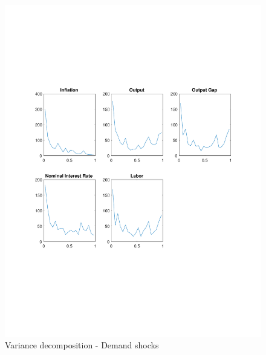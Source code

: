 \documentclass[12pt]{article}
\theoremstyle{definition}
\begin{document}
\begin{figure}[H]
	\centering
	\includegraphics[width=\linewidth, height = 0.4\textheight]{var_demand}
	\caption{Variance decomposition - Demand shocks}
	\label{fig:var_demand}
\end{figure}
\end{document}
